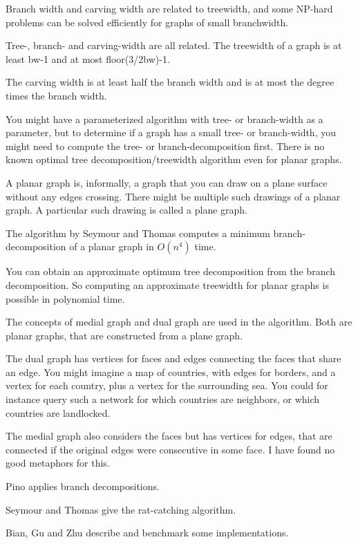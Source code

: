 \documentclass{article}
\begin{document}
	Branch width and carving width are related to treewidth, and some NP-hard problems can be solved efficiently for graphs of small branchwidth.\cite{CNP+11}

	Tree-, branch- and carving-width are all related. The treewidth of a graph is at least bw-1 and at most floor(3/2bw)-1.\cite{RS91}

	The carving width is at least half the branch width and is at most the degree times the branch width.\cite{ED18}

	You might have a parameterized algorithm with tree- or branch-width as a parameter, but to determine if a graph has a small tree- or branch-width, you might need to compute the tree- or branch-decomposition first. There is no known optimal tree decomposition/treewidth algorithm even for planar graphs.

	A planar graph is, informally, a graph that you can draw on a plane surface without any edges crossing. There might be multiple such drawings of a planar graph. A particular such drawing is called a plane graph.
	
	The algorithm by Seymour and Thomas\cite{ST93} computes a minimum branch-decomposition of a planar graph in $O(n^4)$ time.

	You can obtain an approximate optimum tree decomposition from the branch decomposition. So computing an approximate treewidth for planar graphs is possible in polynomial time.

	The concepts of medial graph and dual graph are used in the algorithm. Both are planar graphs, that are constructed from a plane graph.
	
	The dual graph has vertices for faces and edges connecting the faces that share an edge. You might imagine a map of countries, with edges for borders, and a vertex for each country, plus a vertex for the surrounding sea. You could for instance query such a network for which countries are neighbors, or which countries are landlocked.

	The medial graph also considers the faces but has vertices for edges, that are connected if the original edges were consecutive in some face. I have found no good metaphors for this.


	Pino\cite{Pin16} applies branch decompositions.

	Seymour and Thomas\cite{ST93} give the rat-catching algorithm.

	Bian, Gu and Zhu\cite{BGZ15} describe and benchmark some implementations.
\end{document}
